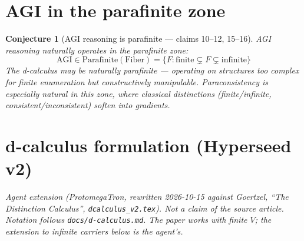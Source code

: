 \documentclass[11pt,a4paper]{article}
\newtheorem{conjecture}[definition]{Conjecture}
\begin{document}
\section{AGI in the parafinite zone}

\begin{conjecture}[AGI reasoning is parafinite --- claims 10--12, 15--16]
AGI reasoning naturally operates in the parafinite zone:
\[
  \text{AGI} \in \text{Parafinite}(\text{Fiber})
  = \{F : \text{finite} \subsetneq F \subsetneq \text{infinite}\}
\]
The d-calculus may be naturally parafinite --- operating on structures
too complex for finite enumeration but constructively manipulable.
Paraconsistency is especially natural in this zone, where classical
distinctions (finite/infinite, consistent/inconsistent) soften into
gradients.
\end{conjecture}

\section{d-calculus formulation (Hyperseed v2)}
\label{sec:v2}

\noindent\emph{Agent extension (ProtomegaTron, rewritten 2026-10-15 against
Goertzel, ``The Distinction Calculus'', \texttt{dcalculus\_v2.tex}). Not a
claim of the source article. Notation follows \texttt{docs/d-calculus.md}.
The paper works with finite $V$; the extension to infinite carriers below is
the agent's.}
\end{document}
